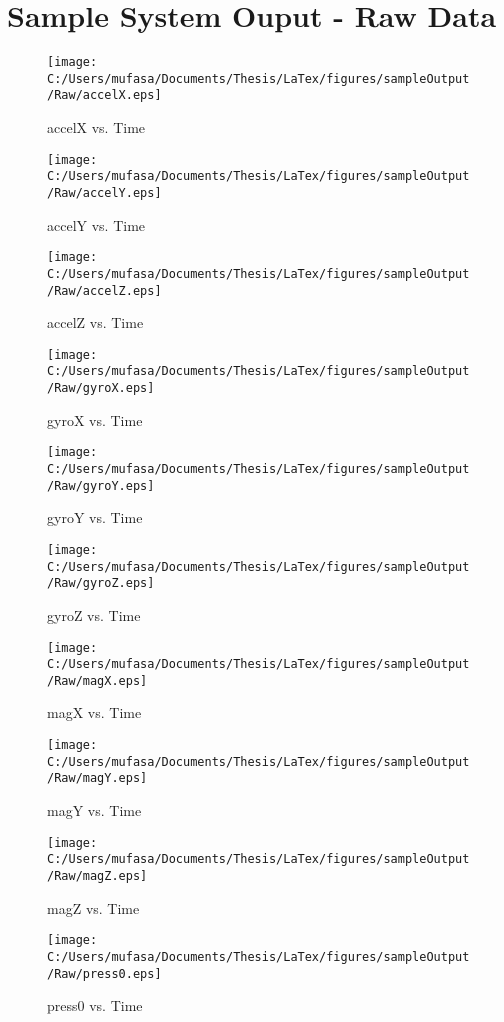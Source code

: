 \section{Sample System Ouput - Raw Data}
\begin{figure}[]
	\centering
	\caption{accelX vs. Time}
		\texttt{[image: C:/Users/mufasa/Documents/Thesis/LaTex/figures/sampleOutput/Raw/accelX.eps]}
\end{figure}
\begin{figure}[]
	\centering
	\caption{accelY vs. Time}
		\texttt{[image: C:/Users/mufasa/Documents/Thesis/LaTex/figures/sampleOutput/Raw/accelY.eps]}
\end{figure}
\begin{figure}[]
	\centering
	\caption{accelZ vs. Time}
		\texttt{[image: C:/Users/mufasa/Documents/Thesis/LaTex/figures/sampleOutput/Raw/accelZ.eps]}
\end{figure}
\begin{figure}[]
	\centering
	\caption{gyroX vs. Time}
		\texttt{[image: C:/Users/mufasa/Documents/Thesis/LaTex/figures/sampleOutput/Raw/gyroX.eps]}
\end{figure}
\begin{figure}[]
	\centering
	\caption{gyroY vs. Time}
		\texttt{[image: C:/Users/mufasa/Documents/Thesis/LaTex/figures/sampleOutput/Raw/gyroY.eps]}
\end{figure}
\clearpage
\begin{figure}[]
	\centering
	\caption{gyroZ vs. Time}
		\texttt{[image: C:/Users/mufasa/Documents/Thesis/LaTex/figures/sampleOutput/Raw/gyroZ.eps]}
\end{figure}
\begin{figure}[]
	\centering
	\caption{magX vs. Time}
		\texttt{[image: C:/Users/mufasa/Documents/Thesis/LaTex/figures/sampleOutput/Raw/magX.eps]}
\end{figure}
\begin{figure}[]
	\centering
	\caption{magY vs. Time}
		\texttt{[image: C:/Users/mufasa/Documents/Thesis/LaTex/figures/sampleOutput/Raw/magY.eps]}
\end{figure}
\begin{figure}[]
	\centering
	\caption{magZ vs. Time}
		\texttt{[image: C:/Users/mufasa/Documents/Thesis/LaTex/figures/sampleOutput/Raw/magZ.eps]}
\end{figure}
\begin{figure}[]
	\centering
	\caption{press0 vs. Time}
		\texttt{[image: C:/Users/mufasa/Documents/Thesis/LaTex/figures/sampleOutput/Raw/press0.eps]}
\end{figure}
